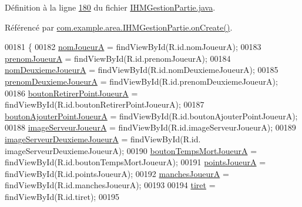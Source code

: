 Définition à la ligne \hyperlink{_i_h_m_gestion_partie_8java_source_l00180}{180} du fichier \hyperlink{_i_h_m_gestion_partie_8java_source}{I\+H\+M\+Gestion\+Partie.\+java}.



Référencé par \hyperlink{_i_h_m_gestion_partie_8java_source_l00106}{com.\+example.\+area.\+I\+H\+M\+Gestion\+Partie.\+on\+Create()}.


\begin{DoxyCode}
00181     \{
00182         \hyperlink{classcom_1_1example_1_1area_1_1_i_h_m_gestion_partie_ad7ac57a177098fba4ba7ea29a2418f10}{nomJoueurA} = findViewById(R.id.nomJoueurA);
00183         \hyperlink{classcom_1_1example_1_1area_1_1_i_h_m_gestion_partie_a9a5b0bc9c6f1d865b85bfe789219e16e}{prenomJoueurA} = findViewById(R.id.prenomJoueurA);
00184         \hyperlink{classcom_1_1example_1_1area_1_1_i_h_m_gestion_partie_a00dbc2ac1396af550520dd011d8e01cc}{nomDeuxiemeJoueurA} = findViewById(R.id.nomDeuxiemeJoueurA);
00185         \hyperlink{classcom_1_1example_1_1area_1_1_i_h_m_gestion_partie_af209e9cda709137d8b77170a35b295e0}{prenomDeuxiemeJoueurA} = findViewById(R.id.prenomDeuxiemeJoueurA);
00186         \hyperlink{classcom_1_1example_1_1area_1_1_i_h_m_gestion_partie_af59fb470e464a16a7f09f4440b18c2e8}{boutonRetirerPointJoueurA} = findViewById(R.id.boutonRetirerPointJoueurA);
00187         \hyperlink{classcom_1_1example_1_1area_1_1_i_h_m_gestion_partie_aa99f420624fb6c990516b30ebe0805cc}{boutonAjouterPointJoueurA} = findViewById(R.id.boutonAjouterPointJoueurA);
00188         \hyperlink{classcom_1_1example_1_1area_1_1_i_h_m_gestion_partie_a811fe6ba189ad62350a6e95c3147a1f0}{imageServeurJoueurA} = findViewById(R.id.imageServeurJoueurA);
00189         \hyperlink{classcom_1_1example_1_1area_1_1_i_h_m_gestion_partie_ad66029deaf2045f16e86ed6059501a1a}{imageServeurDeuxiemeJoueurA} = findViewById(R.id.
      imageServeurDeuxiemeJoueurA);
00190         \hyperlink{classcom_1_1example_1_1area_1_1_i_h_m_gestion_partie_a1014526b0dcc0266e184dc2787fbeeef}{boutonTempsMortJoueurA} = findViewById(R.id.boutonTempsMortJoueurA);
00191         \hyperlink{classcom_1_1example_1_1area_1_1_i_h_m_gestion_partie_affa1414152ba72b6b19e087049e2bda8}{pointsJoueurA} = findViewById(R.id.pointsJoueurA);
00192         \hyperlink{classcom_1_1example_1_1area_1_1_i_h_m_gestion_partie_ac30dccc72d814c0d1eb36aeb5f5bdc1f}{manchesJoueurA} = findViewById(R.id.manchesJoueurA);
00193 
00194         \hyperlink{classcom_1_1example_1_1area_1_1_i_h_m_gestion_partie_a84e6684857fc76364978fff7bfbc4e00}{tiret} = findViewById(R.id.tiret);
00195 

\end{DoxyCode}
